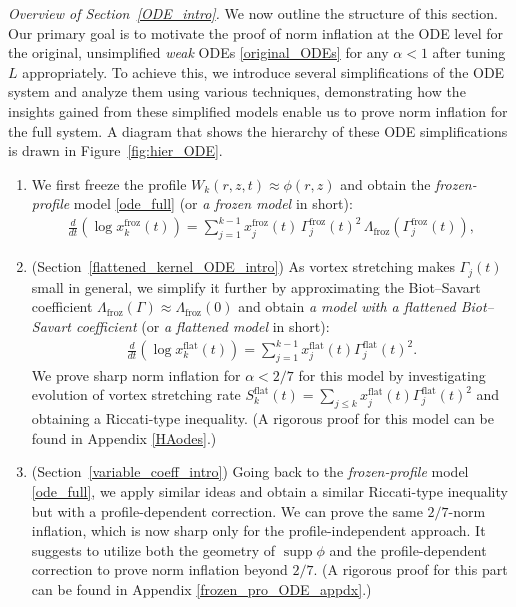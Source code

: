 \documentclass[reqno,11pt]{amsart}
\newcommand{\supp}{\operatorname{supp}}
\begin{document}
\medskip
\noindent \emph{Overview of Section~\ref{ODE_intro}.} 
We now outline the structure of this section. Our primary goal is to motivate the proof of norm inflation at the ODE level for the original, unsimplified \emph{weak} ODEs \eqref{original_ODEs} for any $\alpha<1$ after tuning $L$ appropriately. To achieve this, we introduce several simplifications of the ODE system and analyze them using various techniques, demonstrating how the insights gained from these simplified models enable us to prove norm inflation for the full system. A diagram that shows the hierarchy of these ODE simplifications is drawn in Figure~\ref{fig:hier_ODE}.
    \begin{enumerate}
        \item We first freeze the profile $W_k(r,z,t)\approx \phi(r,z)$ and obtain the \emph{frozen-profile} model \eqref{ode_full} (or \emph{a frozen model} in short):
        \begin{align*}
            \frac{d}{dt}(\log x_k^{\mathrm{froz}}(t))
    =
    \sum_{j=1}^{k-1} x_j^{\mathrm{froz}}(t)\,\Gamma_j^{\mathrm{froz}}(t)^2\,\Lambda_{\mathrm{froz}}(\Gamma_j^{\mathrm{froz}}(t)),
        \end{align*}
    \item (Section~\ref{flattened_kernel_ODE_intro})
        As vortex stretching makes $\Gamma_j(t)$ small in general, we simplify it further by approximating the Biot--Savart coefficient $\Lambda_{\mathrm{froz}} (\Gamma)\approx \Lambda_{\mathrm{froz}}(0)$ and obtain \emph{a model with a flattened Biot--Savart coefficient} (or \emph{a flattened model} in short):
            \begin{align*}
                \frac{d}{dt}(\log x_k^{\mathrm{flat}}(t))
                =
            \sum_{j=1}^{k-1}
            x_j^{\mathrm{flat}}(t) \Gamma_j^{\mathrm{flat}}(t)^2.
            \end{align*}
        We prove sharp norm inflation for $\alpha<2/7$ for this model by investigating evolution of vortex stretching rate $S_k^{\mathrm{flat}}(t)=\sum_{j\leq k} x_j^{\mathrm{flat}}(t) \Gamma_j^{\mathrm{flat}}(t)^2$ and obtaining a Riccati-type inequality. (A rigorous proof for this model can be found in Appendix \ref{HAodes}.)
    \item (Section~\ref{variable_coeff_intro})
        Going back to the \emph{frozen-profile} model \eqref{ode_full},
        we apply similar ideas and obtain a similar Riccati-type inequality but with a profile-dependent correction.
        We can prove the same $2/7$-norm inflation, which is now sharp only for the profile-independent approach. It suggests to utilize both the geometry of $\supp \phi$ and the profile-dependent correction to prove norm inflation beyond $2/7$. (A rigorous proof for this part can be found in Appendix \ref{frozen_pro_ODE_appdx}.)

\end{enumerate}
\end{document}
